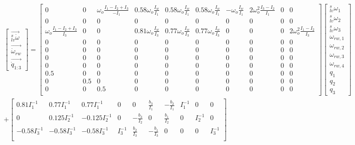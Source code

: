 \tiny
\begin{align}
\begin{bmatrix}
\vec{_{lv}^s\dot{\omega}} \\
\vec{\dot{\omega}_{rw} } \\
\vec{\dot{q}_{1:3}}
\end{bmatrix} 
 \nonumber
= \begin{bmatrix}
0 & 0 & \omega_o\frac{I_1 - I_2 + I_3}{-I_1} & 0.58\omega_o\frac{I_w}{I_1} & 0.58\omega_o\frac{I_w}{I_1} & 0.58\omega_o\frac{I_w}{I_1} & -\omega_o\frac{I_w}{I_1} & 2\omega_o^2\frac{I_3 - I_2}{I_1} & 0 & 0 \\
0 & 0 &	0 & 0 & 0 &	0 & 0 &  0 &  0 & 0\\
 \omega_o\frac{I_1 - I_2 + I_3}{I_3}  & 0 & 0 &  0.81\omega_o\frac{I_w}{I_3} & 0.77\omega_o\frac{I_w}{I_3} & 0.77\omega_o\frac{I_w}{I_3} &	0 & 0 & 0 & 2\omega_o^2\frac{I_1 - I_2}{I_3}\\
0 & 0 &	0  & 0 & 0 & 0 & 0 & 0 & 0& 0\\
0 & 0 &	0  & 0 & 0 & 0 & 0 & 0 & 0& 0 \\
0 & 0 &	0 & 0 & 0 & 0 & 0 & 0 & 0& 0\\
0 & 0 &	0 & 0 & 0 & 0 & 0 & 0 & 0& 0\\
0.5 & 0 &	0 & 0 & 0 & 0 & 0 & 0 & 0& 0 \\
0 & 0.5 &	0& 0 & 0 & 0 & 0 & 0 & 0& 0 \\
0 & 0 &	0.5 & 0 & 0 & 0 & 0 & 0 & 0& 0\\
\end{bmatrix}
\begin{bmatrix}
_{lv}^s\omega_1 \\
_{lv}^s\omega_2 \\
_{lv}^s\omega_3 \\
\omega_{rw,1} \\
\omega_{rw,2} \\
\omega_{rw,3} \\
\omega_{rw,4} \\
q_1 \\
q_2 \\
q_3 
\end{bmatrix}
 \\
 \nonumber
+
\begin{bmatrix}
0.81I_1^{-1} & 0.77I_1^{-1} & 0.77I_1^{-1} & 0 & 0 & \frac{b_3}{I_1} & -\frac{b_2}{I_1}	& I_1^{-1} & 0 & 0\\
0 & 0.125I_2^{-1} & -0.125I_2^{-1} & 0 & - \frac{b_3}{I_2} & 0 &  \frac{b_1}{I_2} & 0 & I_2^{-1} & 0\\ 
-0.58I_3^{-1} & -0.58 I_3^{-1} & -0.58 I_3^{-1} & I_3^{-1} &  \frac{b_2}{I_3} &  -\frac{b_1}{I_3} & 0 & 0 & 0 & I_3^{-1} \\  

\end{bmatrix}
\end{align}
